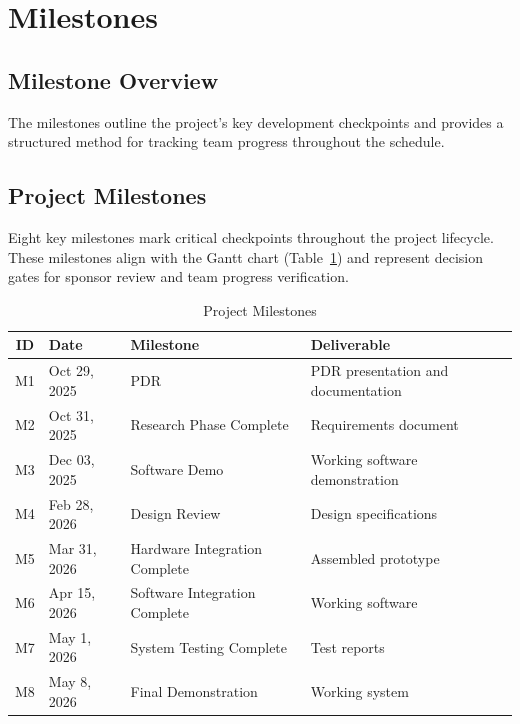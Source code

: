 
\section{Milestones}

\subsection{Milestone Overview}

The milestones outline the project's key development checkpoints and provides a structured method for tracking team progress throughout the schedule. 

\subsection{Project Milestones}

Eight key milestones mark critical checkpoints throughout the project lifecycle. These milestones align with the Gantt chart (Table~\ref{tab:milestones}) and represent decision gates for sponsor review and team progress verification.

\begin{table}[H]
\centering
\caption{Project Milestones}
\label{tab:milestones}
\begin{tabular}{@{}clp{}l@{}}
\toprule
\textbf{ID} & \textbf{Date} & \textbf{Milestone} & \textbf{Deliverable} \\
\midrule
M1 & Oct 29, 2025 & PDR & PDR presentation and documentation \\
M2 & Oct 31, 2025 & Research Phase Complete & Requirements document \\
M3 & Dec 03, 2025 & Software Demo & Working software demonstration \\
M4 & Feb 28, 2026 & Design Review & Design specifications \\
M5 & Mar 31, 2026 & Hardware Integration Complete & Assembled prototype \\
M6 & Apr 15, 2026 & Software Integration Complete & Working software \\
M7 & May 1, 2026 & System Testing Complete & Test reports \\
M8 & May 8, 2026 & Final Demonstration & Working system \\
\bottomrule
\end{tabular}
\end{table}

